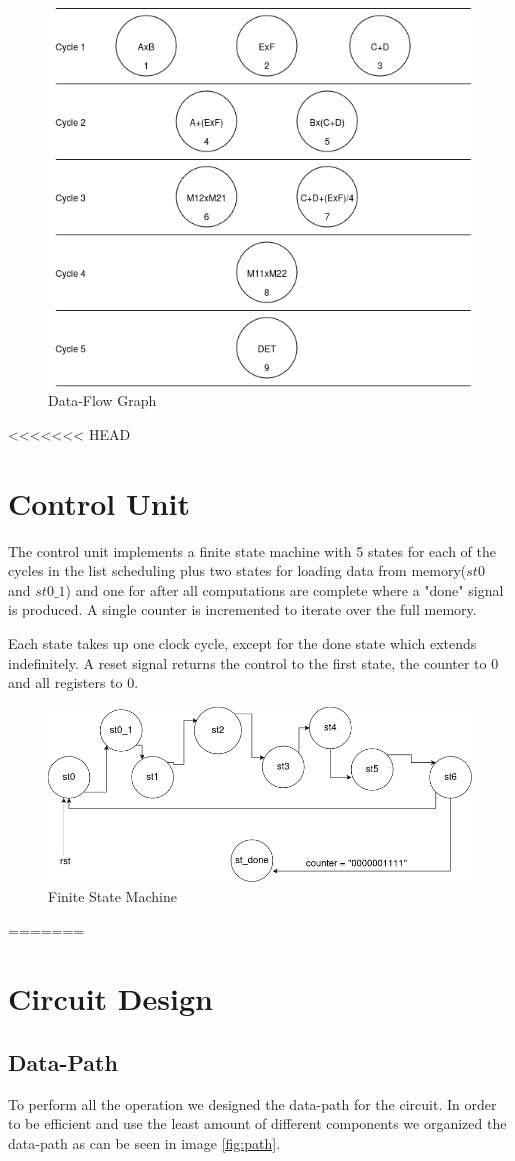 \documentclass[12pt]{article}
\begin{document}
\begin{figure}[H]
	\centering
	\includegraphics[width=0.55\linewidth]{Imagens/stop.drawio.png}
	\caption{Data-Flow Graph}
	\label{fig:sch}
\end{figure}

<<<<<<< HEAD
\section{Control Unit}
The control unit implements a finite state machine with 5 states for each of the cycles in the list scheduling plus two states for loading data from memory($st0$ and $st0\_1$) and one for after all computations are complete where a "done" signal is produced. A single counter is incremented to iterate over the full memory.

Each state takes up one clock cycle, except for the done state which extends indefinitely. A reset signal returns the control to the first state, the counter to 0 and all registers to 0.

\begin{figure}[H]
	\centering
	\includegraphics[width=0.55\linewidth]{Imagens/FSM_lab2.drawio.png}
	\caption{Finite State Machine}
	\label{fig:fsm}
\end{figure}

=======
\section{Circuit Design}
\subsection{Data-Path}
To perform all the operation we designed the data-path for the circuit. In order to be efficient and use the least amount of different components we organized the data-path as can be seen in image \ref{fig:path}. 
\end{document}
